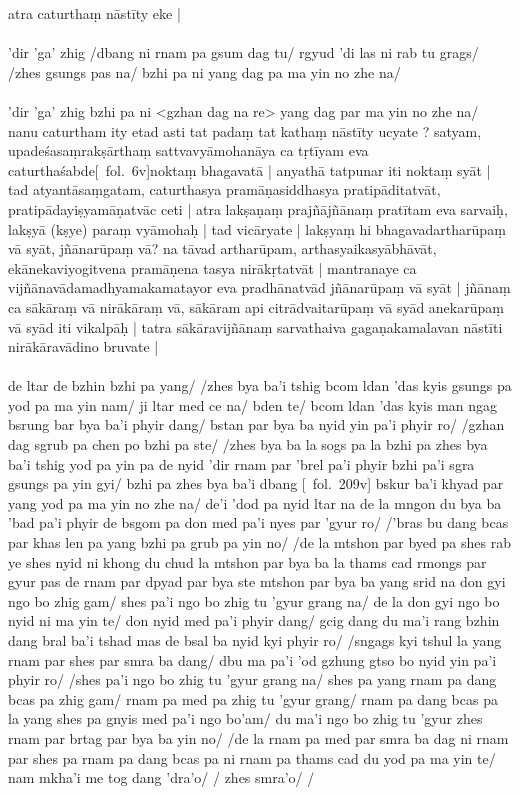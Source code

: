 \documentclass[12pt]{article}
\begin{document}
atra caturthaṃ nāstīty eke |\\

\textbf{\TVA}\\
'dir 'ga' zhig /dbang ni rnam pa gsum dag tu/ rgyud 'di las ni rab tu grags/ /zhes gsungs pas na/ bzhi pa ni yang dag pa ma yin no zhe na/\\

\textbf{\TVB}\\
'dir 'ga' zhig bzhi pa ni <gzhan dag na re> yang dag par ma yin no zhe na/\\

nanu caturtham ity etad asti tat padaṃ tat kathaṃ nāstīty ucyate ? satyam, upadeśasaṃrakṣārthaṃ sattvavyāmohanāya ca tṛtīyam eva caturthaśabde[\MS\ fol.\ 6v]noktaṃ bhagavatā | anyathā tatpunar iti noktaṃ syāt | tad atyantāsaṃgatam, caturthasya pramāṇasiddhasya pratipāditatvāt, pratipādayiṣyamāṇatvāc ceti | atra lakṣaṇaṃ prajñājñānaṃ pratītam eva sarvaiḥ, lakṣyā (kṣye) paraṃ vyāmohaḥ | tad vicāryate | lakṣyaṃ hi bhagavadartharūpaṃ vā syāt, jñānarūpaṃ vā? na tāvad artharūpam, arthasyaikasyābhāvāt, ekānekaviyogitvena pramāṇena tasya nirākṛtatvāt | mantranaye ca vijñānavādamadhyamakamatayor eva pradhānatvād jñānarūpaṃ vā syāt | jñānaṃ ca sākāraṃ vā nirākāraṃ vā, sākāram api citrādvaitarūpaṃ vā syād anekarūpaṃ vā syād iti vikalpāḥ | tatra sākāravijñānaṃ sarvathaiva gagaṇakamalavan nāstīti nirākāravādino bruvate |\\

\textbf{\TVA}\\
de ltar de bzhin bzhi pa yang/ /zhes bya ba'i tshig bcom ldan 'das kyis gsungs pa yod pa ma yin nam/ ji ltar med ce na/ bden te/ bcom ldan 'das kyis man ngag bsrung bar bya ba'i phyir dang/ bstan par bya ba nyid yin pa'i phyir ro/ /gzhan dag sgrub pa chen po bzhi pa ste/ /zhes bya ba la sogs pa la bzhi pa zhes bya ba'i tshig yod pa yin pa de nyid 'dir rnam par 'brel pa'i phyir bzhi pa'i sgra gsungs pa yin gyi/ bzhi pa zhes bya ba'i dbang [\TVA\ fol.\ 209v] bskur ba'i khyad par yang yod pa ma yin no zhe na/ de'i 'dod pa nyid ltar na de la mngon du bya ba 'bad pa'i phyir de bsgom pa don med pa'i nyes par 'gyur ro/ /'bras bu dang bcas par khas len pa yang bzhi pa grub pa yin no/ /de la mtshon par byed pa shes rab ye shes nyid ni khong du chud la mtshon par bya ba la thams cad rmongs par gyur pas de rnam par dpyad par bya ste mtshon par bya ba yang srid na don gyi ngo bo zhig gam/ shes pa'i ngo bo zhig tu 'gyur grang na/ de la don gyi ngo bo nyid ni ma yin te/ don nyid med pa'i phyir dang/ gcig dang du ma'i rang bzhin dang bral ba'i tshad mas de bsal ba nyid kyi phyir ro/ /sngags kyi tshul la yang rnam par shes par smra ba dang/ dbu ma pa'i 'od gzhung gtso bo nyid yin pa'i phyir ro/ /shes pa'i ngo bo zhig tu 'gyur grang na/ shes pa yang rnam pa dang bcas pa zhig gam/ rnam pa med pa zhig tu 'gyur grang/ rnam pa dang bcas pa la yang shes pa gnyis med pa'i ngo bo'am/ du ma'i ngo bo zhig tu 'gyur zhes rnam par brtag par bya ba yin no/ /de la rnam pa med par smra ba dag ni rnam par shes pa rnam pa dang bcas pa ni rnam pa thams cad du yod pa ma yin te/ nam mkha'i me tog dang 'dra'o/ / zhes smra'o/ /\\
\end{document}
